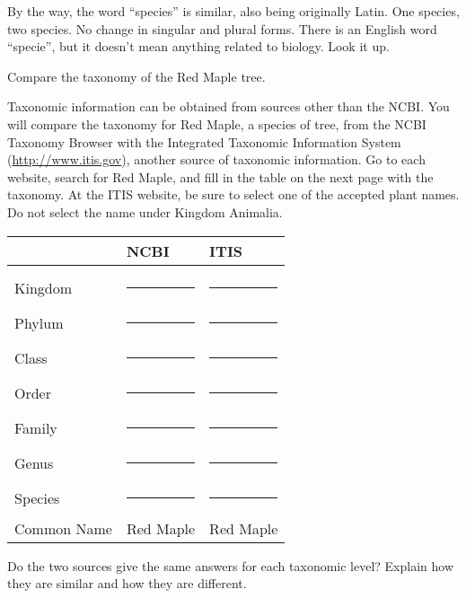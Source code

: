 \documentclass[11pt]{exam}
\begin{document}
\begin{questions}
By the way, the word “species” is similar, also being originally Latin.
One species, two species. No change in singular and plural forms. There
is an English word “specie”, but it doesn’t mean anything related to
biology. Look it up.

\question
Compare the taxonomy of the Red Maple tree.

Taxonomic information can be obtained from sources other than the NCBI. You will compare the taxonomy for Red Maple, a species of tree, from the NCBI Taxonomy Browser with the Integrated Taxonomic Information System (\url{http://www.itis.gov}), another source of taxonomic information. Go to each website, search for Red Maple, and fill in the table on the next page with the taxonomy. At the ITIS website, be sure to select one of the accepted plant names. Do not select the name under Kingdom Animalia. 

\newpage

\begin{longtable}[l]{@{}L{0.75in}L{1.1in}L{1.1in}@{}}
\toprule
& \hfil NCBI\hfill & \hfil ITIS \hfill \tabularnewline
\midrule
 & & \\
Kingdom & 
\else\rule{1in}{0.4pt}\fi & 
\else\rule{1in}{0.4pt}\fi \tabularnewline[3ex]
%
Phylum & 
\else\rule{1in}{0.4pt}\fi & 
\else\rule{1in}{0.4pt}\fi \tabularnewline[3ex]
%
Class & 
\else\rule{1in}{0.4pt}\fi & 
\else\rule{1in}{0.4pt}\fi \tabularnewline[3ex]
%
Order & 
\else\rule{1in}{0.4pt}\fi & 
\else\rule{1in}{0.4pt}\fi \tabularnewline[3ex]
%
Family & 
\else\rule{1in}{0.4pt}\fi & 
\else\rule{1in}{0.4pt}\fi \tabularnewline[3ex]
%
Genus & 
\else\rule{1in}{0.4pt}\fi & 
\else\rule{1in}{0.4pt}\fi \tabularnewline[3ex]
%
Species & 
\else\rule{1in}{0.4pt}\fi & 
\else\rule{1in}{0.4pt}\fi \tabularnewline[3ex]
%
Common Name & Red Maple & Red Maple \tabularnewline[3ex]
\bottomrule
\end{longtable}

\question
Do the two sources give the same answers for each taxonomic level? Explain how they are similar and how they are different.

\end{questions}
\end{document}
